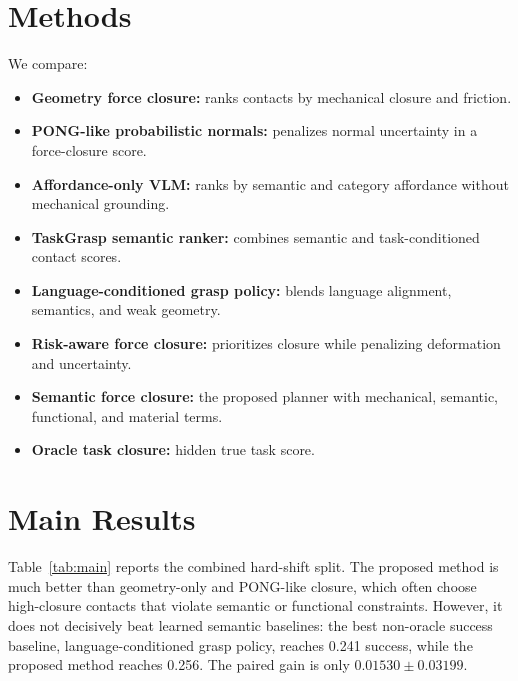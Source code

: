 \documentclass{article}
\begin{document}
\section{Methods}
We compare:
\begin{itemize}
\item \textbf{Geometry force closure:} ranks contacts by mechanical closure and friction.
\item \textbf{PONG-like probabilistic normals:} penalizes normal uncertainty in a force-closure score.
\item \textbf{Affordance-only VLM:} ranks by semantic and category affordance without mechanical grounding.
\item \textbf{TaskGrasp semantic ranker:} combines semantic and task-conditioned contact scores.
\item \textbf{Language-conditioned grasp policy:} blends language alignment, semantics, and weak geometry.
\item \textbf{Risk-aware force closure:} prioritizes closure while penalizing deformation and uncertainty.
\item \textbf{Semantic force closure:} the proposed planner with mechanical, semantic, functional, and material terms.
\item \textbf{Oracle task closure:} hidden true task score.
\end{itemize}

\section{Main Results}
Table~\ref{tab:main} reports the combined hard-shift split. The proposed method is much better than geometry-only and PONG-like closure, which often choose high-closure contacts that violate semantic or functional constraints. However, it does not decisively beat learned semantic baselines: the best non-oracle success baseline, language-conditioned grasp policy, reaches 0.241 success, while the proposed method reaches 0.256. The paired gain is only $0.01530 \pm 0.03199$.
\end{document}
